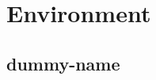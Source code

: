 \documentclass{beamer}
\begin{document}

	\section{Environment}	
	\subsection{dummy-name}
	
\end{document}
